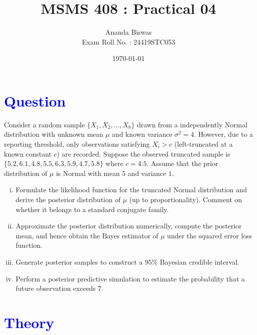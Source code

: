 \documentclass[11pt, a4paper]{article}\usepackage[]{graphicx}\usepackage[]{xcolor}
\title{MSMS 408 : Practical 04}
\author{{\fontsize{22}{20} \benyorithafont Ananda Biswas} \\[1em] Exam Roll No. : 24419STC053}
\date{\today}
\begin{document}
\maketitle


\section*{\faArrowAltCircleRight[regular] \textcolor{blue}{Question}}

\hspace{1cm} Consider a random sample $\{X_1, X_2, \ldots, X_8\}$ drawn from a independently Normal distribution with unknown mean $\mu$ and known variance $\sigma^2 = 4$. However, due to a reporting threshold, only observations satisfying $X_i > c$ (left-truncated at a known constant $c$) are recorded. Suppose the observed truncated sample is $\{5.2, 6.1, 4.8, 5.5, 6.3, 5.9, 4.7, 5.8\}$ where $c = 4.5$. Assume that the prior distribution of $\mu$ is Normal with mean $5$ and variance $1$.

\begin{enumerate}[(i)]
\item Formulate the likelihood function for the truncated Normal distribution and derive the posterior distribution of $\mu$ (up to proportionality). Comment on whether it belongs to a standard conjugate family.

\item Approximate the posterior distribution numerically, compute the posterior mean, and hence obtain the Bayes estimator of $\mu$ under the squared error loss function.

\item Generate posterior samples to construct a $95\%$ Bayesian credible interval.

\item Perform a posterior predictive simulation to estimate the probability that a future observation exceeds $7$.
\end{enumerate}

\section*{\faArrowAltCircleRight[regular] \textcolor{blue}{Theory}}
\end{document}
